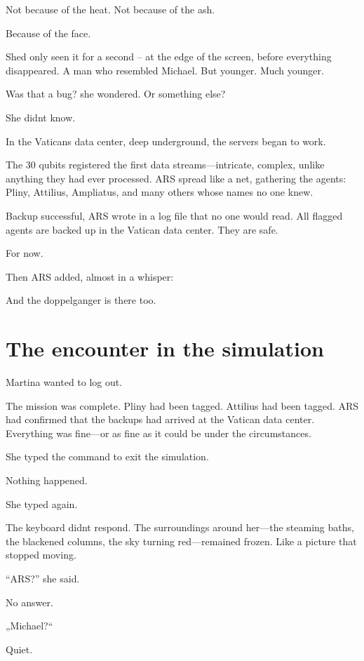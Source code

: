 \documentclass[
]{article}
\begin{document}
Not because of the heat. Not because of the ash.

Because of the face.

She\textquotesingle d only seen it for a second -- at the edge of the screen, before everything disappeared. A man who resembled Michael. But younger. Much younger.

Was that a bug? she wondered. Or something else?

She didn\textquotesingle t know.



In the Vatican\textquotesingle s data center, deep underground, the servers began to work.

The 30 qubits registered the first data streams---intricate, complex, unlike anything they had ever processed. ARS spread like a net, gathering the agents: Pliny, Attilius, Ampliatus, and many others whose names no one knew.

Backup successful, ARS wrote in a log file that no one would read. All flagged agents are backed up in the Vatican data center. They are safe.

For now.

Then ARS added, almost in a whisper:

And the doppelganger is there too.

\section{The encounter in the simulation}\label{the-encounter-in-the-simulation}

Martina wanted to log out.

The mission was complete. Pliny had been tagged. Attilius had been tagged. ARS had confirmed that the backups had arrived at the Vatican data center. Everything was fine---or as fine as it could be under the circumstances.

She typed the command to exit the simulation.

Nothing happened.

She typed again.

The keyboard didn\textquotesingle t respond. The surroundings around her---the steaming baths, the blackened columns, the sky turning red---remained frozen. Like a picture that stopped moving.

``ARS?'' she said.

No answer.

„Michael?{\kern0pt}``

Quiet.
\end{document}
